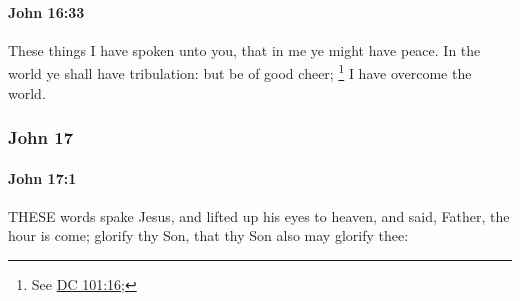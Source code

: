 		\paragraph{John 16:33} %
			\label{JOHN-16-33}

			These things I have spoken unto you, that in me ye might have peace. In the world ye shall have tribulation: but be of good cheer;%
				\footnote{%
					See \hyperref[DC101-16]{DC 101:16}; 
					}
			I have overcome the world.

			\begin{framed}
			\scriptsize
				\begin{compactdesc}
					\item[SBLG] 
				\end{compactdesc}
			\end{framed}

	\subsubsection{John 17} %
		\label{JOHN-17}
		
		\paragraph{John 17:1} %
			\label{JOHN-17-1}

			THESE words spake Jesus, and lifted up his eyes to heaven, and said, Father, the hour is come; glorify thy Son, that thy Son also may glorify thee:

